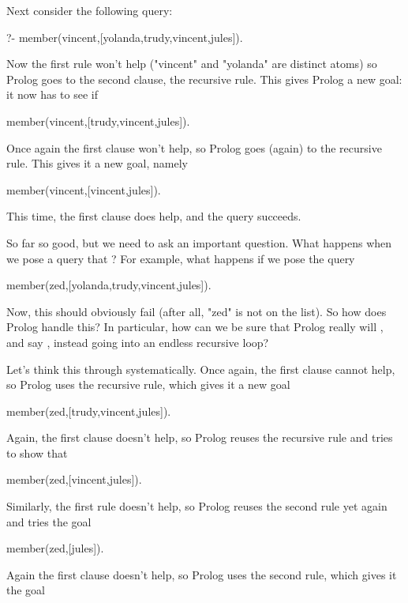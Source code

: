 Next consider the following query:

\begin{LPNcodedisplay}
?- member(vincent,[yolanda,trudy,vincent,jules]).
\end{LPNcodedisplay}
Now the first rule won't help ("vincent" and "yolanda" are
distinct atoms) so Prolog goes to the second clause, the recursive
rule. This gives Prolog a new goal: it now has to see if

\begin{LPNcodedisplay}
member(vincent,[trudy,vincent,jules]).
\end{LPNcodedisplay}
Once again the first clause won't help, so Prolog goes (again) to
the recursive rule. This gives it a new goal, namely

\begin{LPNcodedisplay}
member(vincent,[vincent,jules]).
\end{LPNcodedisplay}
This time, the first clause does help, and the query succeeds.

So far so good, but we need to ask an important question.  What
happens when we pose a query that ?  For example, what
happens if we pose the query

\begin{LPNcodedisplay}
member(zed,[yolanda,trudy,vincent,jules]).
\end{LPNcodedisplay}


Now, this should obviously fail (after all, "zed" is not on the
list).  So how does Prolog handle this?  In particular, how can we be
sure that Prolog really will , and say , instead
going into an endless recursive loop?

Let's think this through systematically.  Once again, the first clause
cannot help, so Prolog uses the recursive rule, which gives it a new
goal

\begin{LPNcodedisplay}
member(zed,[trudy,vincent,jules]).
\end{LPNcodedisplay}
Again, the first clause doesn't help, so Prolog reuses the recursive
rule and tries to show that

\begin{LPNcodedisplay}
member(zed,[vincent,jules]).
\end{LPNcodedisplay}
Similarly, the first rule doesn't help, so Prolog reuses the second
rule yet again and
tries the goal
\begin{LPNcodedisplay}
member(zed,[jules]).
\end{LPNcodedisplay}
Again the first clause doesn't help, so Prolog uses the second rule,
which gives it the goal


